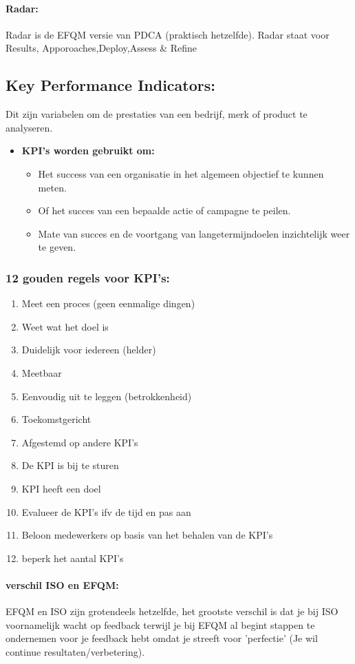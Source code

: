 \documentclass[12pt]{article}
\begin{document}
\paragraph{Radar:}
Radar is de EFQM versie van PDCA (praktisch hetzelfde).
Radar staat voor Results, Apporoaches,Deploy,Assess \& Refine
\subsection{Key Performance Indicators:}
Dit zijn variabelen om de prestaties van een bedrijf, merk of product te analyseren.
\begin{itemize}
    \item[]\textbf{KPI's worden gebruikt om:}\begin{itemize}
        \item Het success van een organisatie in het algemeen objectief te kunnen meten.
        \item Of het succes van een bepaalde actie of campagne te peilen.
        \item Mate van succes en de voortgang van langetermijndoelen inzichtelijk weer te geven.
    \end{itemize}
\end{itemize}
\subsubsection{12 gouden regels voor KPI's:}
\begin{enumerate}
    \item Meet een proces (geen eenmalige dingen)
    \item Weet wat het doel is
    \item Duidelijk voor iedereen (helder)
    \item Meetbaar
    \item Eenvoudig uit te leggen (betrokkenheid)
    \item Toekomstgericht
    \item Afgestemd op andere KPI's
    \item De KPI is bij te sturen
    \item KPI heeft een doel
    \item Evalueer de KPI's ifv de tijd en pas aan 
    \item Beloon medewerkers op basis van het behalen van de KPI's
    \item beperk het aantal KPI's
\end{enumerate}
\paragraph{verschil ISO en EFQM:}
EFQM en ISO zijn grotendeels hetzelfde, het grootste verschil is dat je bij ISO voornamelijk wacht op feedback terwijl je bij EFQM al begint stappen te ondernemen voor je feedback hebt omdat je streeft voor 'perfectie' (Je wil continue resultaten/verbetering).
\end{document}
